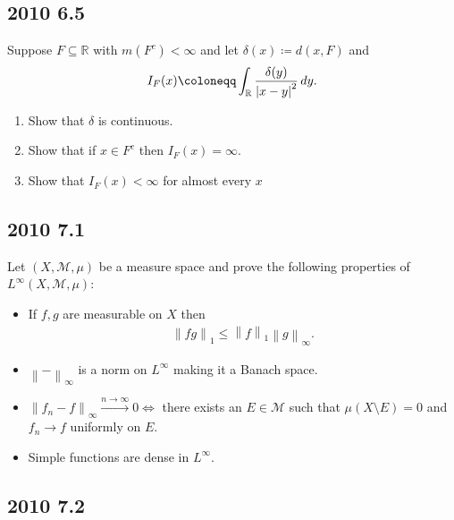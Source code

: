 \hypertarget{section-6}{%
\subsection{2010 6.5}\label{section-6}}

Suppose \(F \subseteq {\mathbb{R}}\) with \(m(F^c) < \infty\) and let
\(\delta(x) \coloneqq d(x, F)\) and
\begin{align*}
I_F(x) \coloneqq\int_{\mathbb{R}}{ \delta(y) \over {\left\lvert {x-y} \right\rvert}^2 } \,dy
.\end{align*}

\begin{enumerate}
\def\labelenumi{\alph{enumi}.}
\item
  Show that \(\delta\) is continuous.
\item
  Show that if \(x\in F^c\) then \(I_F(x) = \infty\).
\item
  Show that \(I_F(x) < \infty\) for almost every \(x\)
\end{enumerate}

\hypertarget{section-7}{%
\subsection{2010 7.1}\label{section-7}}

Let \((X, \mathcal{M}, \mu)\) be a measure space and prove the following
properties of \(L^ \infty (X, \mathcal{M}, \mu)\):

\begin{itemize}
\item
  If \(f, g\) are measurable on \(X\) then
  \begin{align*}
  {\left\lVert {fg} \right\rVert}_1 \leq {\left\lVert {f} \right\rVert}_1 {\left\lVert {g} \right\rVert}_{\infty }
  .\end{align*}
\item
  \({\left\lVert {{-}} \right\rVert}_{\infty }\) is a norm on
  \(L^{\infty }\) making it a Banach space.
\item
  \({\left\lVert {f_n - f} \right\rVert}_{\infty } \overset{n\to \infty }\to 0 \iff\)
  there exists an \(E\in \mathcal{M}\) such that
  \(\mu(X\setminus E) = 0\) and \(f_n \to f\) uniformly on \(E\).
\item
  Simple functions are dense in \(L^{\infty }\).
\end{itemize}

\hypertarget{section-8}{%
\subsection{2010 7.2}\label{section-8}}

